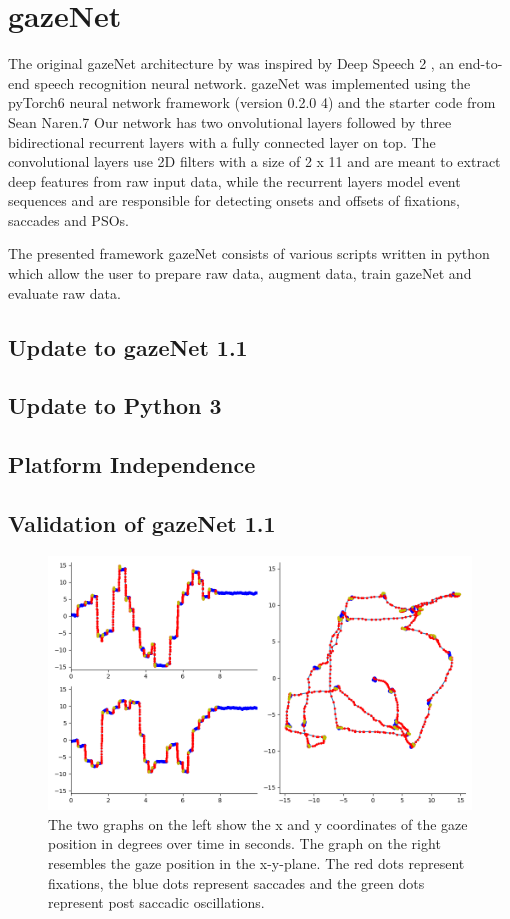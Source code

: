 \documentclass[conference]{IEEEtran}
\begin{document}
\section{gazeNet}
The original gazeNet architecture by \citet{zemblys2018gazeNet} was inspired by Deep Speech 2 \citeauthor{deep_speech_2}, an end-to-end speech recognition neural network. gazeNet was implemented using the pyTorch6 neural network framework (version 0.2.0 4) and the starter code from Sean Naren.7 Our network has two onvolutional layers followed by three bidirectional recurrent layers with a fully connected layer on top. The convolutional layers use 2D filters with a size of 2 x 11 and are meant to extract deep features from raw input data, while the recurrent layers model event sequences and are responsible for detecting onsets and offsets of fixations, saccades and PSOs. \citet{zemblys2018gazeNet}

The presented framework gazeNet consists of various scripts written in python which allow the user to prepare raw data, augment data, train gazeNet and evaluate raw data.



\subsection{Update to gazeNet 1.1}
\subsection{Update to Python 3}

\subsection{Platform Independence}

\subsection{Validation of gazeNet 1.1}
\begin{figure}[h]
    \includegraphics[width=\linewidth]{TH34_img_Europe_labelled_MN}
    \caption{The two graphs on the left show the x and y coordinates of the gaze position in degrees over time in seconds. The graph on the right resembles the gaze position in the x-y-plane. The red dots represent fixations, the blue dots represent saccades and the green dots represent post saccadic oscillations.}
\end{figure}
\end{document}
